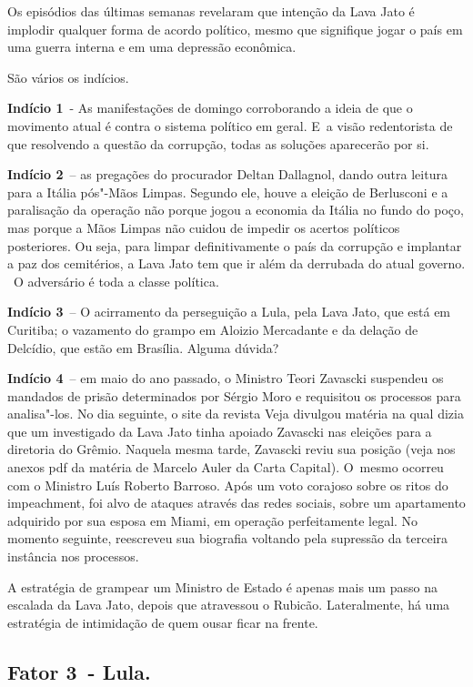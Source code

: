 Os episódios das últimas semanas revelaram que intenção da Lava Jato é
implodir qualquer forma de acordo político, mesmo que signifique jogar o
país em uma guerra interna e em uma depressão econômica.

São vários os indícios.

\textbf{Indício 1}~- As manifestações de domingo corroborando a ideia de
que o movimento atual é contra o sistema político em geral. E~a visão
redentorista de que resolvendo a questão da corrupção, todas as soluções
aparecerão por si.

\textbf{Indício 2}~-- as pregações do procurador Deltan Dallagnol, dando
outra leitura para a Itália pós"-Mãos Limpas. Segundo ele, houve a
eleição de Berlusconi e a paralisação da operação não porque jogou a
economia da Itália no fundo do poço, mas porque a Mãos Limpas não cuidou
de impedir os acertos políticos posteriores. Ou seja, para limpar
definitivamente o país da corrupção e implantar a paz dos cemitérios, a
Lava Jato tem que ir além da derrubada do atual governo. ~O adversário é
toda a classe política.

\textbf{Indício 3}~-- O acirramento da perseguição a Lula, pela Lava
Jato, que está em Curitiba; o vazamento do grampo em Aloizio Mercadante
e da delação de Delcídio, que estão em Brasília. Alguma dúvida?

\textbf{Indício 4}~-- em maio do ano passado, o Ministro Teori Zavascki
suspendeu os mandados de prisão determinados por Sérgio Moro e
requisitou os processos para analisa"-los. No dia seguinte, o site da
revista Veja divulgou matéria na qual dizia que um investigado da Lava
Jato tinha apoiado Zavascki nas eleições para a diretoria do Grêmio.
Naquela mesma tarde, Zavascki reviu sua posição (veja nos anexos pdf da
matéria de Marcelo Auler da Carta Capital). O~mesmo ocorreu com o
Ministro Luís Roberto Barroso. Após um voto corajoso sobre os ritos do
impeachment, foi alvo de ataques através das redes sociais, sobre um
apartamento adquirido por sua esposa em Miami, em operação perfeitamente
legal. No momento seguinte, reescreveu sua biografia voltando pela
supressão da terceira instância nos processos.

A estratégia de grampear um Ministro de Estado é apenas mais um passo na
escalada da Lava Jato, depois que atravessou o Rubicão. Lateralmente, há
uma estratégia de intimidação de quem ousar ficar na frente.

\subsection{\textbf{Fator 3}~- Lula.~}

